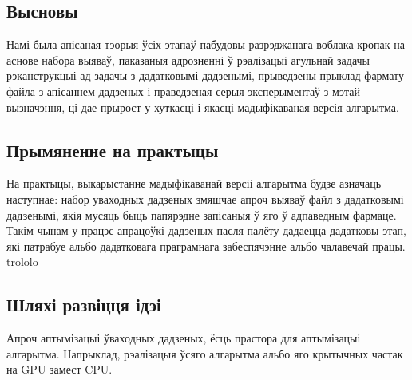 \begin{center}
    \section*{Высновы}    
\end{center}

Намі была апісаная тэорыя ўсіх этапаў пабудовы разрэджанага воблака кропак на аснове набора выяваў, паказаныя адрозненні ў рэалізацыі агульнай задачы рэканструкцыі ад задачы з дадатковымі дадзенымі, прыведзены прыклад фармату файла з апісаннем дадзеных і праведзеная серыя эксперыментаў з мэтай вызначэння, ці дае прырост у хуткасці і якасці мадыфікаваная версія алгарытма.\\

\subsection*{Прымяненне на практыцы}
На практыцы, выкарыстанне мадыфікаванай версіі алгарытма будзе азначаць наступнае: набор уваходных дадзеных змяшчае апроч выяваў файл з дадатковымі дадзенымі, якія мусяць быць папярэдне запісаныя ў яго ў адпаведным фармаце. Такім чынам у працэс апрацоўкі дадзеных пасля палёту дадаецца дадатковы этап, які патрабуе альбо дадатковага праграмнага забеспячэнне альбо чалавечай працы.\\
trololo

\subsection*{Шляхі развіцця ідэі}
Апроч аптымізацыі ўваходных дадзеных, ёсць прастора для аптымізацыі алгарытма. Напрыклад, рэалізацыя ўсяго алгарытма альбо яго крытычных частак на GPU замест CPU.

\newpage